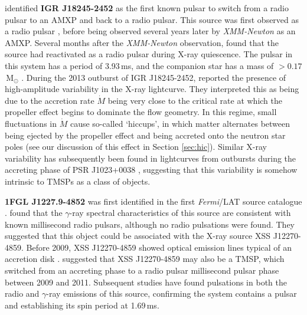 \par \citealp{Papitto_Swings} identified \textbf{IGR J18245-2452} as the first known pulsar to switch from a radio pulsar to an AMXP and back to a radio pulsar.  This source was first observed as a radio pulsar \citep{Manchester_PulsarCat}, before being observed several years later by \indexxmm\textit{XMM-Newton} \citep{Eckert_IGRJ18245} as an AMXP. Several months after the \textit{XMM-Newton} observation, \citealp{Papitto_Finding} found that the source had reactivated as a radio pulsar during X-ray quiescence. The pulsar in this system has a period of 3.93\,ms, and the companion star has a mass of $>0.17$\,M$_\odot$ \citep{Papitto_Swings}. During the 2013 outburst of IGR J18245-2452, \citealp{Ferrigno_TMSPVar} reported the presence of high-amplitude variability in the X-ray lightcurve. They interpreted this as being due to the accretion rate $\dot{M}$ being very close to the critical rate at which the propeller effect begins to dominate the flow geometry. In this regime, small fluctuations in $\dot{M}$ cause so-called `hiccups', in which matter alternates between being ejected by the propeller effect and being accreted onto the neutron star poles (see our discussion of this effect in Section \ref{sec:hic}). Similar X-ray variability has subsequently been found in lightcurves from outbursts during the accreting phase of PSR J1023+0038 \citep{Bogdanov_TMSPVar}, suggesting that this variability is somehow intrinsic to TMSPs as a class of objects.
\par \textbf{1FGL J1227.9-4852} was first identified in the first \textit{Fermi}/LAT source catalogue \citep{Abdo_Catalogue}. \citealp{Hill_XSS} found that the $\gamma$-ray spectral characteristics of this source are consistent with known millisecond radio pulsars, although no radio pulsations were found. They suggested that this object could be associated with the X-ray source XSS J12270-4859. Before 2009, XSS J12270-4859 showed optical emission lines typical of an accretion disk \citep{Pretorius_Optical}. \citealp{Hill_XSS} suggested that XSS J12270-4859 may also be a TMSP, which switched from an accreting phase to a radio pulsar millisecond pulsar phase between 2009 and 2011. Subsequent studies have found pulsations in both the radio \citep{Roy_12270Spin} and $\gamma$-ray \citep{Johnson_12270Spin} emissions of this source, confirming the system contains a pulsar and establishing its spin period at 1.69\,ms.
